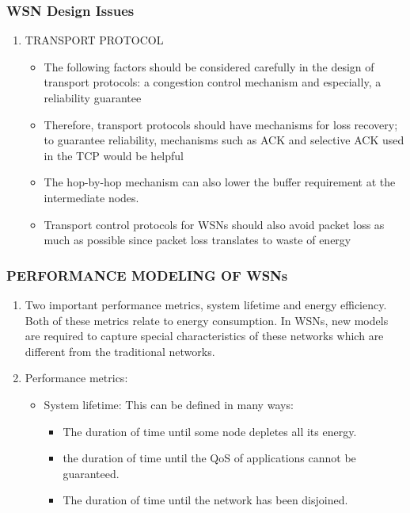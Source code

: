 \documentclass[11pt]{beamer}
\begin{document}
			\begin{frame}
				\frametitle{WSN Design Issues}
			\begin{enumerate}
				\item TRANSPORT PROTOCOL
				\begin{itemize}
					\item The following factors should be considered carefully in the design of transport protocols:
					a congestion control mechanism and especially, a reliability guarantee 
					\item Therefore, transport protocols should have mechanisms for loss recovery;	to guarantee reliability, mechanisms such as ACK and selective ACK used in the TCP would be helpful  
					\item The hop-by-hop mechanism can also lower the buffer requirement at the intermediate nodes. 
					\item Transport control protocols for WSNs should also avoid packet loss as much as possible since packet loss translates to waste of energy
				\end{itemize}
			\end{enumerate}
			\end{frame}
			\begin{frame}
				\frametitle{PERFORMANCE MODELING OF WSNs}
				\begin{enumerate}
					\item Two important performance metrics, system lifetime and energy efficiency. Both of these metrics relate to energy consumption.
					In WSNs, new models are required to capture special characteristics of these networks which are different from the traditional networks.
					\item Performance metrics:
					\begin{itemize}
						\item System lifetime:
						This can be defined in many ways:
						\begin{itemize}
							\item The duration of time until some node depletes all its energy.
							\item the duration of time until the QoS of applications cannot be guaranteed.
							\item The duration of time until the network has been disjoined.
						\end{itemize}
					\end{itemize}
				\end{enumerate}
			\end{frame}
\end{document}
